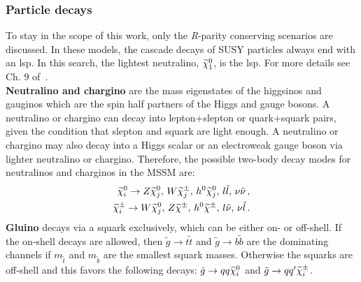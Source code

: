 \subsubsection{Particle decays}
\label{mssm_particleDecays}
To stay in the scope of this work, only the {\it R}-parity conserving scenarios are discussed. In these models, the cascade decays of SUSY particles always end with an \acrshort{lsp}. In this search, the lightest neutralino, $ \widetilde{\chi}^0_1$, is the \acrshort{lsp}. For more details see Ch. 9 of~\cite{SUSY1}.
\\
\textbf{Neutralino and chargino} are the mass eigenstates of the higgsinos and gauginos which are the spin half partners of the Higgs and gauge bosons. A neutralino or chargino can decay into lepton+slepton or quark+squark pairs, given the condition that slepton and squark are light enough. A neutralino or chargino may also decay into a Higgs scalar or an electroweak gauge boson via lighter neutralino or chargino. 
Therefore, the possible two-body decay modes for neutralinos and charginos in the MSSM are:
\begin{eqnarray}
\label{ChiDecays}
\widetilde{\chi}^0_i \rightarrow Z \widetilde{\chi}^0_j, \, W \widetilde{\chi}^{\pm}_j,\,  h^0\widetilde{\chi}^0_j ,\,l\tilde{l},\,\nu\tilde{\nu} \, ,\nonumber\\
\widetilde{\chi}^{\pm}_i \rightarrow W \widetilde{\chi}^0_j,\, Z \widetilde{\chi}^{\pm} ,\, h^0\widetilde{\chi}^{\pm},\,l\tilde{\nu},\,\nu\tilde{l} \, .
\end{eqnarray}
\textbf{Gluino} decays via a squark exclusively, which can be either on- or off-shell. If the on-shell decays are allowed, then $\tilde{g} \rightarrow t\tilde{t}$ and $\tilde{g} \rightarrow b\tilde{b}$ are the dominating channels if $m_{\tilde{t}}$ and $m_{\tilde{b}}$ are the smallest squark masses. Otherwise the squarks are off-shell and this favors the following decays: $\tilde{g} \rightarrow qq\widetilde{\chi}^0_i$ and $\tilde{g} \rightarrow qq'\widetilde{\chi}^{\pm}_i$.
\\

